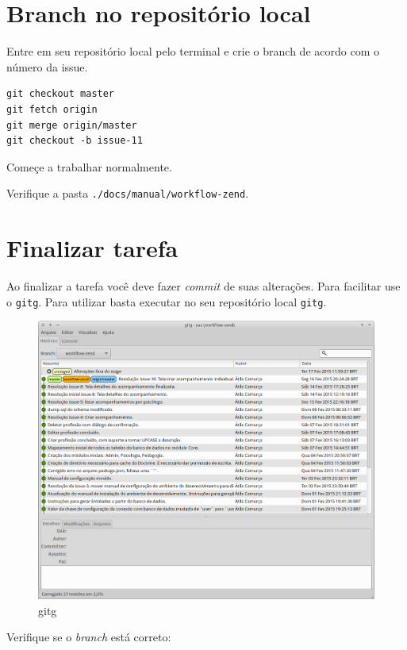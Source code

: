 \section{Branch no repositório
local}\label{branch-no-reposituxf3rio-local}

Entre em seu repositório local pelo terminal e crie o branch de acordo
com o número da issue.

\begin{verbatim}
git checkout master
git fetch origin
git merge origin/master
git checkout -b issue-11
\end{verbatim}

Começe a trabalhar normalmente.

Verifique a pasta \texttt{./docs/manual/workflow-zend}.

\section{Finalizar tarefa}\label{finalizar-tarefa}

Ao finalizar a tarefa você deve fazer \emph{commit} de suas alterações.
Para facilitar use o \texttt{gitg}. Para utilizar basta executar no seu
repositório local \texttt{gitg}.

\begin{figure}[H]
    \includegraphics[scale=0.4]{img/gitg.png}
    \caption{gitg}
\end{figure}

Verifique se o \emph{branch} está correto:

